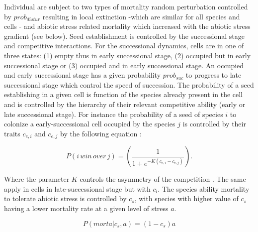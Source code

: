 \documentclass[a4paper,11pt]{article}
\begin{document}
Individual are subject to two
types of mortality random perturbation controlled by
$prob_{distur}$ resulting in local extinction -which are  similar for all
species  and cells - and  abiotic stress  related mortality which
increased with the abiotic stress gradient (see below). Seed
establishment is controlled by the successional stage and
competitive interactions. For the successional dynamics, cells
are in one of three states: (1) empty thus in early successional
stage, (2) occupied but in early successional stage or (3)
occupied and in early successional stage. An occupied and early
successional stage has a given probability $prob_{suc}$ to
progress to late successional stage which control the speed of
succession. The probability of a seed establishing in a given
cell is function of the species already present in the cell and
is controlled by the hierarchy of their relevant competitive
ability (early or late successional stage). For instance the
probability of a seed of species $i$ to colonize a
early-successional cell occupied by the species $j$  is
controlled by their traits $c_{e,i}$ and $c_{e,j}$ by the
following equation \citep[as in][]{Law-1997}: 

\begin{equation}
\label{eq:Law}
P(i \, win \, over \, j)=\left(\frac{1}{1+e^{-K(c_{e,i}-c_{e,j})}}\right).
\end{equation}

Where the parameter $K$ controls the asymmetry of the competition
\citep[see][]{Law-1997,Calcagno-2006}. The same apply in cells in
late-successional stage but with $c_l$. The species ability
mortality to tolerate abiotic stress is controlled by $c_s$, with
species with higher value of $c_s$ having a lower mortality rate
at a given level of stress $a$. 

\begin{equation}
\label{eq:MortaStress}
P(morta | c_s , a)= (1- c_s) a
\end{equation}
\end{document}
